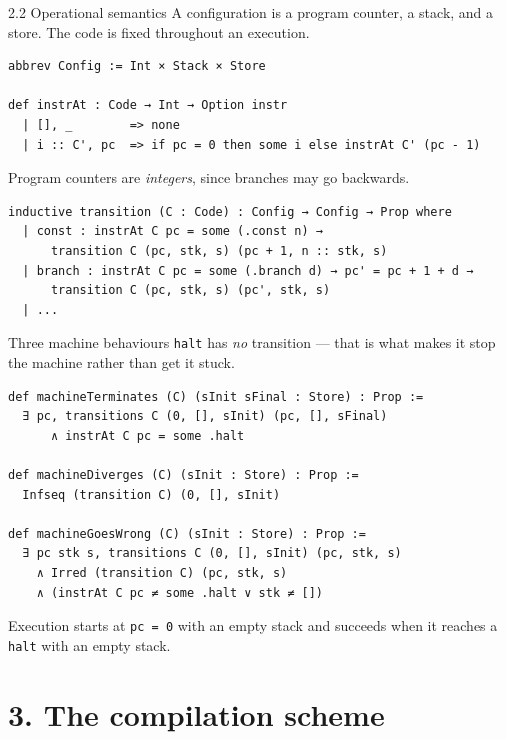 \documentclass[aspectratio=169,10pt]{beamer}
\newcommand{\code}[1]{\texttt{\small #1}}
\begin{document}
\begin{frame}[fragile]{2.2 Operational semantics}
A configuration is a program counter, a stack, and a store.  The code is
fixed throughout an execution.
\begin{lstlisting}
abbrev Config := Int × Stack × Store

def instrAt : Code → Int → Option instr
  | [], _        => none
  | i :: C', pc  => if pc = 0 then some i else instrAt C' (pc - 1)
\end{lstlisting}
Program counters are \emph{integers}, since branches may go backwards.
\begin{lstlisting}
inductive transition (C : Code) : Config → Config → Prop where
  | const : instrAt C pc = some (.const n) →
      transition C (pc, stk, s) (pc + 1, n :: stk, s)
  | branch : instrAt C pc = some (.branch d) → pc' = pc + 1 + d →
      transition C (pc, stk, s) (pc', stk, s)
  | ...
\end{lstlisting}
\end{frame}

\begin{frame}[fragile]{Three machine behaviours}
\code{halt} has \emph{no} transition --- that is what makes it stop the machine
rather than get it stuck.
\begin{lstlisting}
def machineTerminates (C) (sInit sFinal : Store) : Prop :=
  ∃ pc, transitions C (0, [], sInit) (pc, [], sFinal)
      ∧ instrAt C pc = some .halt

def machineDiverges (C) (sInit : Store) : Prop :=
  Infseq (transition C) (0, [], sInit)

def machineGoesWrong (C) (sInit : Store) : Prop :=
  ∃ pc stk s, transitions C (0, [], sInit) (pc, stk, s)
    ∧ Irred (transition C) (pc, stk, s)
    ∧ (instrAt C pc ≠ some .halt ∨ stk ≠ [])
\end{lstlisting}
Execution starts at \code{pc = 0} with an empty stack and succeeds when it
reaches a \code{halt} with an empty stack.
\end{frame}

\section{3. The compilation scheme}
\end{document}
